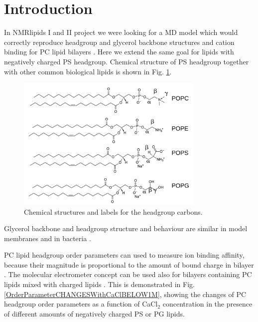 \documentclass[aps,prl,superscriptaddress,twocolumn]{revtex4}
\begin{document}
\section{Introduction}

In NMRlipids I and II project we were looking for a MD model
which would correctly reproduce headgroup and glycerol
backbone structures and cation binding for PC lipid bilayers \cite{botan15,catte16}.
Here we extend the same goal for lipids with negatively charged PS headgroup.
Chemical structure of PS headgroup together with other common biological
lipids is shown in Fig. \ref{lipids}.
\begin{figure}[]
  \centering
  \includegraphics[width=9.0cm]{../Figs/lipids.pdf}
  \caption{\label{lipids}
    Chemical structures and labels for the headgroup carbons.
  }
\end{figure}

Glycerol backbone and headgroup structure and behaviour are similar in model membranes and in bacteria \cite{gally81,scherer87,seelig90}.

PC lipid headgroup order parameters can used to measure ion binding
affinity, because their magnitude is proportional
to the amount of bound charge in bilayer \cite{seelig87,catte16}.
The molecular electrometer concept can be used also
for bilayers containing PC lipids mixed with charged lipids \cite{borle85,macdonald87,roux90}.
This is demonstrated in Fig. %
\ref{OrderParameterCHANGESWithCaClBELOW1M},
showing the changes of PC headgroup order parameters %
as a function of CaCl$_2$ concentration in the presence of different amounts of
negatively charged PS or PG lipids.
\end{document}
